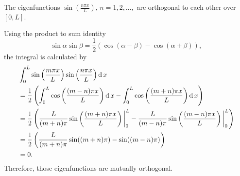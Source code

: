 \begin{example}
  The eigenfunctions $\sin\left(\frac{n\pi x}{L}\right)$, $n=1,2,\dots, $ are orthogonal to each other over $[0, L]$.
\end{example}
\begin{solution}
  Using the product to sum identity
  \[\sin \alpha\sin\beta=\frac12\left(\cos(\alpha-\beta)-\cos(\alpha+\beta)\right),\]
  the integral is calculated by
  \[
    \begin{aligned}
      &\int_0^L \sin\left(\frac{m\pi x}{L}\right) \sin\left(\frac{n\pi x}{L}\right)\operatorname{d} x\\
      &=\frac12 \left(\int_0^L \cos\left(\frac{(m-n)\pi x}{L}\right)\operatorname{d} x - \int_0^L \cos\left(\frac{(m+n)\pi x}{L}\right)\operatorname{d} x\right)\\
      &=\frac12 \left(\frac{L}{(m+n)\pi}\sin\left(\frac{(m+n)\pi x}{L}\right)\bigg|_0^L - \frac{L}{(m-n)\pi}\sin\left(\frac{(m-n)\pi x}{L}\right)\bigg|_0^L \right)\\
      &=\frac12 \left(\frac{L}{(m+n)\pi}\sin((m+n)\pi)-\sin((m-n)\pi)\right)\\
      &=0.
    \end{aligned}
   \]
   Therefore, those eigenfunctions are mutually orthogonal.
\end{solution}

